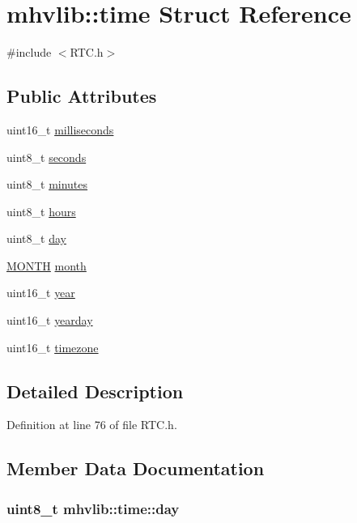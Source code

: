 \hypertarget{structmhvlib_1_1time}{\section{mhvlib\-:\-:time Struct Reference}
\label{structmhvlib_1_1time}
}


{\ttfamily \#include $<$R\-T\-C.\-h$>$}

\subsection*{Public Attributes}
\begin{DoxyCompactItemize}
\item 
uint16\-\_\-t \hyperlink{structmhvlib_1_1time_a0b0b145a52365fb68e077e3ebcef28b8}{milliseconds}
\item 
uint8\-\_\-t \hyperlink{structmhvlib_1_1time_ad1bc14b0ac5176d5dc09295e97635530}{seconds}
\item 
uint8\-\_\-t \hyperlink{structmhvlib_1_1time_a19b38390c496f5c4d7557f136e1dc570}{minutes}
\item 
uint8\-\_\-t \hyperlink{structmhvlib_1_1time_a21c3499e1eee705b238737c764d9bdc7}{hours}
\item 
uint8\-\_\-t \hyperlink{structmhvlib_1_1time_a61d96d13fffe1b24f1cef65e27e1f8b8}{day}
\item 
\hyperlink{namespacemhvlib_a2406fef93804eb87fef77054c6a2082c}{M\-O\-N\-T\-H} \hyperlink{structmhvlib_1_1time_af2ff6a04a1b94055373c39b9c5f3868c}{month}
\item 
uint16\-\_\-t \hyperlink{structmhvlib_1_1time_a1b56819ba3570d83f26f858229a7b8f1}{year}
\item 
uint16\-\_\-t \hyperlink{structmhvlib_1_1time_a640b9d59757af0bdb141d98d6ccfc0d4}{yearday}
\item 
uint16\-\_\-t \hyperlink{structmhvlib_1_1time_a23553b1b821151cf502d83aad78c2584}{timezone}
\end{DoxyCompactItemize}


\subsection{Detailed Description}


Definition at line 76 of file R\-T\-C.\-h.



\subsection{Member Data Documentation}
\hypertarget{structmhvlib_1_1time_a61d96d13fffe1b24f1cef65e27e1f8b8}{
\subsubsection[{day}]{\setlength{\rightskip}{0pt plus 5cm}uint8\-\_\-t mhvlib\-::time\-::day}}\label{structmhvlib_1_1time_a61d96d13fffe1b24f1cef65e27e1f8b8}



